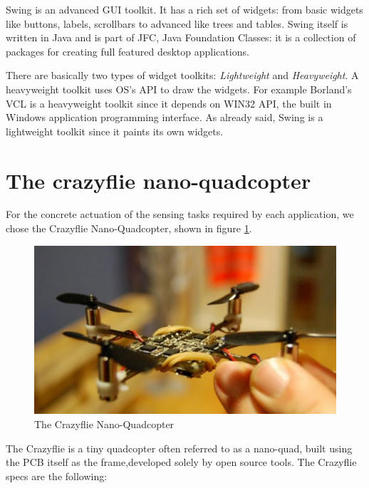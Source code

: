 Swing is an advanced GUI toolkit. It has a rich set of widgets:
from basic widgets like buttons, labels, scrollbars to advanced like trees and tables. 
Swing itself is written in Java and is part of JFC, Java Foundation Classes: it is a collection of packages for creating full featured desktop applications.

There are basically two types of widget toolkits: \textit{Lightweight} and \textit{Heavyweight}.
A heavyweight toolkit uses OS's API to draw the widgets. For example Borland's VCL is a heavyweight toolkit since it depends on WIN32 API, the built in Windows application programming interface.
As already said, Swing is a lightweight toolkit since it paints its own widgets.

\section{The crazyflie nano-quadcopter}\label{crazyflie}

For the concrete actuation of the sensing tasks required by each application, we chose the Crazyflie Nano-Quadcopter, shown in figure \ref{fig:crazyflie}.


\begin{figure}[H]
\centering
\includegraphics[width=\linewidth]
{pictures/crazyflie.jpg}
  \caption{The Crazyflie Nano-Quadcopter}
  \label{fig:crazyflie}
\end{figure}

The Crazyflie is a tiny quadcopter often referred to as a nano-quad, built using the PCB itself as the frame,developed solely by open source tools. The Crazyflie specs are the following:


